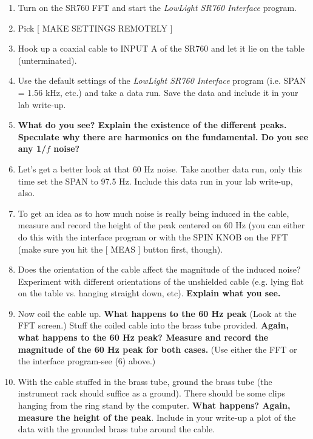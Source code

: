 \documentclass{../lab}
\begin{document}
\begin{enumerate}
    \item Turn on the SR760 FFT and start the \emph{LowLight SR760 Interface} program.

    \item Pick [ MAKE SETTINGS REMOTELY ]

    \item Hook up a coaxial cable to INPUT A of the SR760 and let it lie on the table (unterminated).

    \item Use the default settings of the \emph{LowLight SR760 Interface} program (i.e. SPAN = 1.56 kHz, etc.) and take a data run. Save the data and include it in your lab write-up.

    \item \textbf{What do you see? Explain the existence of the different peaks. Speculate why there are harmonics on the fundamental. Do you see any 1/$f$ noise?}

    \item Let's get a better look at that 60 Hz noise. Take another data run, only this time set the SPAN to 97.5 Hz. Include this data run in your lab write-up, also.

    \item To get an idea as to how much noise is really being induced in the cable, measure and record the height of the peak centered on 60 Hz (you can either do this with the interface program or with the SPIN KNOB on the FFT (make sure you hit the [ MEAS ] button first, though).

    \item Does the orientation of the cable affect the magnitude of the induced noise? Experiment with different orientations of the unshielded cable (e.g. lying flat on the table vs. hanging straight down, etc). \textbf{Explain what you see.}

    \item Now coil the cable up. \textbf{What happens to the 60 Hz peak} (Look at the FFT screen.) Stuff the coiled cable into the brass tube provided. \textbf{Again, what happens to the 60 Hz peak? Measure and record the magnitude of the 60 Hz peak for both cases.} (Use either the FFT or the interface program-see (6) above.)

    \item With the cable stuffed in the brass tube, ground the brass tube (the instrument rack should suffice as a ground). There should be some clips hanging from the ring stand by the computer. \textbf{What happens? Again, measure the height of the peak}. Include in your write-up a plot of the data with the grounded brass tube around the cable.

\end{enumerate}
\end{document}
